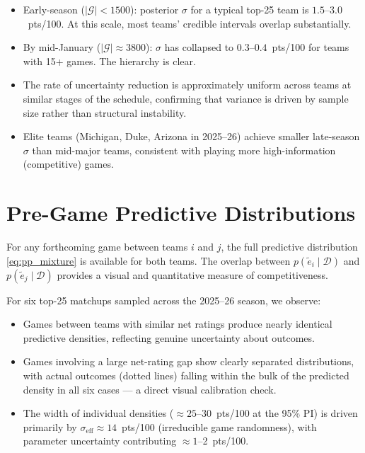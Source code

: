 \documentclass[11pt]{article}
\begin{document}
\begin{itemize}
  \item Early-season ($|\mathcal{G}| < 1500$): posterior $\sigma$ for a typical
    top-25 team is $1.5$--$3.0$~pts/100.  At this scale, most teams' credible
    intervals overlap substantially.
  \item By mid-January ($|\mathcal{G}| \approx 3800$): $\sigma$ has collapsed to
    $0.3$--$0.4$~pts/100 for teams with 15+ games.  The hierarchy is clear.
  \item The rate of uncertainty reduction is approximately uniform across teams
    at similar stages of the schedule, confirming that variance is driven by
    sample size rather than structural instability.
  \item Elite teams (Michigan, Duke, Arizona in 2025--26) achieve smaller
    late-season $\sigma$ than mid-major teams, consistent with playing more
    high-information (competitive) games.
\end{itemize}

\section{Pre-Game Predictive Distributions}

For any forthcoming game between teams $i$ and $j$, the full predictive
distribution \eqref{eq:pp_mixture} is available for both teams.  The overlap
between $p(\tilde{e}_i \mid \mathcal{D})$ and $p(\tilde{e}_j \mid \mathcal{D})$ provides a
visual and quantitative measure of competitiveness.

For six top-25 matchups sampled across the 2025--26 season, we observe:
\begin{itemize}
  \item Games between teams with similar net ratings produce nearly identical
    predictive densities, reflecting genuine uncertainty about outcomes.
  \item Games involving a large net-rating gap show clearly separated
    distributions, with actual outcomes (dotted lines) falling within the bulk
    of the predicted density in all six cases --- a direct visual calibration check.
  \item The width of individual densities ($\approx 25$--30~pts/100 at the 95\% PI)
    is driven primarily by $\sigma_{\text{eff}} \approx 14$~pts/100 (irreducible
    game randomness), with parameter uncertainty contributing $\approx 1$--2~pts/100.
\end{itemize}
\end{document}
